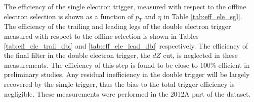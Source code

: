 
The efficiency of the single electron trigger, measured 
with respect to the offline electron selection is shown 
as a function of $p_T$ and $\eta$ in Table \ref{tab:eff_ele_sgl}.
The efficiency of the trailing and leading legs of the double electron trigger
measured with respect to the offline selection is shown
in Tables \ref{tab:eff_ele_trail_dbl} and \ref{tab:eff_ele_lead_dbl} respectively.
The efficiency of the final filter in the double electron trigger, the $dZ$ cut,
is neglected in these measurements.  The efficiency of this step is found to be
close to 100\% efficient in preliminary studies.  Any residual inefficiency
in the double trigger will be largely recovered by the single trigger,
thus the bias to the total trigger efficiency is negligible.
These measurements were performed in the 2012A part of the dataset.

